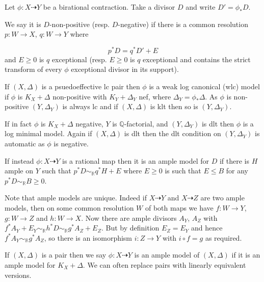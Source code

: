 \documentclass[a4paper,12pt]{amsart}
\begin{document}
	\begin{definition}
		Let $\phi:X \dashrightarrow Y$ be a birational contraction. Take a divisor $D$ and write $D'=\phi_{*}D$. 
		
		We say it is $D$-non-positive (resp. $D$-negative) if there is a common resolution $p:W \to X$, $q:W \to Y$ where 
		
		\[p^{*}D=q^{*}D'+E\]
		and $E \geq 0$ is $q$ exceptional (resp. $E \geq 0$ is $q$ exceptional and contains the strict transform of every $\phi$ exceptional divisor in its support). 
		
		If $(X,\Delta)$ is a psuedoeffective lc pair then $\phi$ is a weak log canonical (wlc) model if $\phi$ is $K_{X}+\Delta$ non-positive with $K_{Y}+\Delta_{Y}$ nef, where $\Delta_{Y}=\phi_{*}\Delta$. As $\phi$ is non-positive $(Y,\Delta_{Y})$ is always lc and if $(X,\Delta)$ is klt then so is $(Y,\Delta_{Y})$. 
		
		If in fact $\phi$ is $K_{X}+\Delta$ negative, $Y$ is $\mathbb{Q}$-factorial, and $(Y,\Delta_{Y})$ is dlt then $\phi$ is a log minimal model. Again if $(X,\Delta)$ is dlt then the dlt condition on $(Y,\Delta_{Y})$ is automatic as $\phi$ is negative.
		
		If instead $\phi:X \dashrightarrow Y$ is a rational map then it is an ample model for $D$ if there is $H$ ample on $Y$ such that $p^{*}D\sim_{\mathbb{R}}q^{*}H+E$ where $E \geq 0$ is such that $E \leq B$ for any $p^{*}D \sim_{\mathbb{R}} B \geq 0$.
	\end{definition}
	
	
	Note that ample models are unique. Indeed if $X \dashrightarrow Y$ and $X \dashrightarrow Z$ are two ample models, then on some common resolution $W$ of both maps we have $f:W \to Y$, $g:W \to Z$ and $h:W \to X$. Now there are ample divisors $A_{Y}$, $A_{Z}$ with $f^{*}A_{Y}+E_{Y}\sim_{\mathbb{R}}h^{*}D \sim_{\mathbb{R}}g^{*}A_{Z}+E_{Z}$. But by definition $E_{Z}=E_{Y}$ and hence $f^{*}A_{Y}\sim_{\mathbb{R}}g^{*}A_{Z}$, so there is an isomorphism $i:Z \to Y$ with $i \circ f= g$ as required.
	
	If $(X,\Delta)$ is a pair then we say $\phi:X \dashrightarrow Y$ is an ample model of $(X,\Delta)$ if it is an ample model for $K_{X}+\Delta$. We can often replace pairs with linearly equivalent versions.
	
\end{document}
